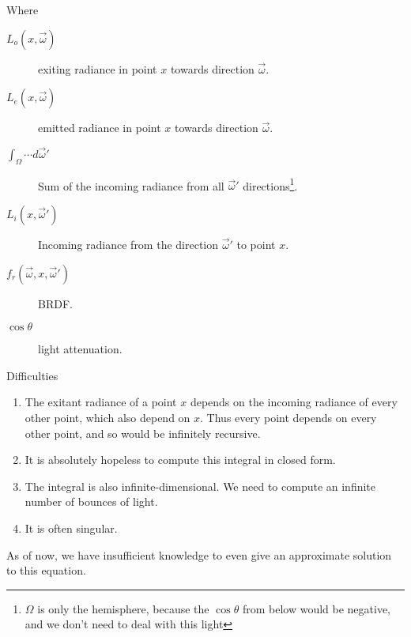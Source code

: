 \documentclass[10pt]{armath}
\numberwithin{equation}{section}
\theoremstyle{definition}
\begin{document}
\begin{multicols}{2}
  Where
  \begin{description}
    \item[$L_o\left(x,\vec{\omega}\right)$] exiting radiance in point $x$ towards
      direction $\vec{\omega}$.
    \item[$L_e\left(x,\vec{\omega}\right)$] emitted radiance in point $x$ towards
      direction $\vec{\omega}$.
    \item[$\int_\Omega\cdots d\vec{\omega}'$] Sum of the incoming radiance from
      all $\vec{\omega}'$ directions\footnote{$\Omega$ is only the hemisphere,
        because the $\cos\theta$ from below would be negative, and we don't need
        to deal with this light}.
    \item[$L_i\left(x,\vec{\omega}'\right)$] Incoming radiance from the direction
      $\vec{\omega}'$ to point $x$.
    \item[$f_r\left(\vec{\omega},x,\vec{\omega}'\right)$] BRDF.
    \item[$\cos\theta$] light attenuation.
  \end{description}

  Difficulties
  \begin{enumerate}
    \item The exitant radiance of a point $x$ depends on the incoming radiance of
      every other point, which also depend on $x$. Thus every point depends on
      every other point, and so would be infinitely recursive.
    \item It is absolutely hopeless to compute this integral in closed form.
    \item The integral is also infinite-dimensional. We need to compute an
      infinite number of bounces of light.
    \item It is often singular.
  \end{enumerate}

  As of now, we have insufficient knowledge to even give an approximate solution
  to this equation.


\end{multicols}
\end{document}
